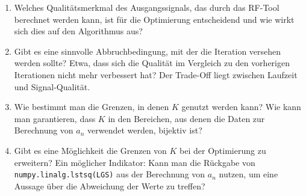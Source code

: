 \documentclass[../Report.tex]{subfiles}
\begin{document}
\begin{enumerate}
	\item	Welches Qualitätsmerkmal des Ausgangssignals, das durch das RF-Tool \cite{RF-Tool} berechnet werden kann, ist für die Optimierung entscheidend und wie wirkt sich dies auf den Algorithmus aus?
	
	\item	Gibt es eine sinnvolle Abbruchbedingung, mit der die Iteration versehen werden sollte? Etwa, dass sich die Qualität im Vergleich zu den vorherigen Iterationen nicht mehr verbessert hat? Der Trade-Off liegt zwischen Laufzeit und Signal-Qualität.
	
	\item	Wie bestimmt man die Grenzen, in denen $K$ genutzt werden kann? Wie kann man garantieren, dass $K$ in den Bereichen, aus denen die Daten zur Berechnung von $a_n$ verwendet werden, bijektiv ist?
	
	\item	Gibt es eine Möglichkeit die Grenzen von $K$ bei der Optimierung zu erweitern? Ein möglicher Indikator: Kann man die Rückgabe von \lstinline{numpy.linalg.lstsq(LGS)} aus der Berechnung von $a_n$ nutzen, um eine Aussage über die Abweichung der Werte zu treffen?
\end{enumerate}
\end{document}
